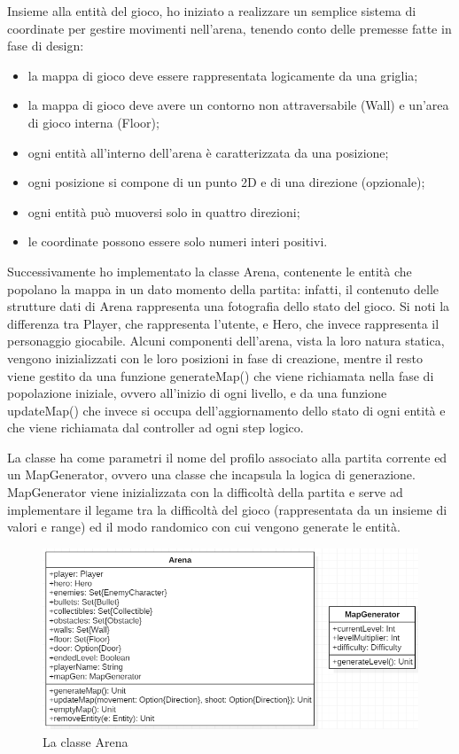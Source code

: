 Insieme alla entità del gioco, ho iniziato a realizzare un semplice sistema di coordinate per gestire movimenti nell'arena, tenendo conto delle premesse fatte in fase di design:
\begin{itemize}
    \item la mappa di gioco deve essere rappresentata logicamente da una griglia;
    \item la mappa di gioco deve avere un contorno non attraversabile (Wall) e un'area di gioco interna (Floor);
    \item ogni entità all'interno dell'arena è caratterizzata da una posizione;
    \item ogni posizione si compone di un punto 2D e di una direzione (opzionale);
    \item ogni entità può muoversi solo in quattro direzioni;
    \item le coordinate possono essere solo numeri interi positivi.
\end{itemize}

Successivamente ho implementato la classe Arena, contenente le entità che popolano la mappa in un dato momento della partita: infatti, il contenuto delle strutture dati di Arena rappresenta una fotografia dello stato del gioco. Si noti la differenza tra Player, che rappresenta l'utente, e Hero, che invece rappresenta il personaggio giocabile. Alcuni componenti dell'arena, vista la loro natura statica, vengono inizializzati con le loro posizioni in fase di creazione, mentre il resto viene gestito da una funzione generateMap() che viene richiamata nella fase di popolazione iniziale, ovvero all'inizio di ogni livello, e da una funzione updateMap() che invece si occupa dell'aggiornamento dello stato di ogni entità e che viene richiamata dal controller ad ogni step logico.

La classe ha come parametri il nome del profilo associato alla partita corrente ed un MapGenerator, ovvero una classe che incapsula la logica di generazione. MapGenerator viene inizializzata con la difficoltà della partita e serve ad implementare il legame tra la difficoltà del gioco (rappresentata da un insieme di valori e range) ed il modo randomico con cui vengono generate le entità.
\begin{figure}[H]
  \includegraphics[width=15cm]{res/arenaClass.png}
  \caption{La classe Arena}
  \label{arenaCLass}
\end{figure}

